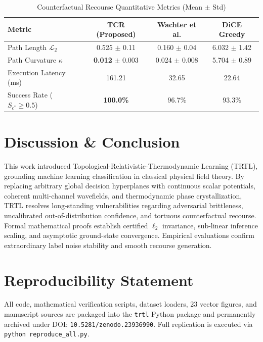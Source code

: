 \documentclass[journal,twoside]{IEEEtran}
\theoremstyle{remark}
\begin{document}
\begin{table}[!h]
\centering
\caption{Counterfactual Recourse Quantitative Metrics (Mean $\pm$ Std)}
\label{tab:recourse}
\small
\begin{tabular}{lccc}
\toprule
\textbf{Metric} & \textbf{TCR (Proposed)} & \textbf{Wachter et al.} & \textbf{DiCE Greedy} \\
\midrule
Path Length $\mathcal{L}_2$ & 0.525 $\pm$ 0.11 & 0.160 $\pm$ 0.04 & 6.032 $\pm$ 1.42 \\
Path Curvature $\kappa$    & \textbf{0.012} $\pm$ 0.003 & 0.024 $\pm$ 0.008 & 5.704 $\pm$ 0.89 \\
Execution Latency (ms)     & 161.21 & 32.65 & 22.64 \\
Success Rate ($S_{c^*} \ge 0.5$) & \textbf{100.0\%} & 96.7\% & 93.3\% \\
\bottomrule
\end{tabular}
\end{table}

\section{Discussion \& Conclusion}
This work introduced Topological-Relativistic-Thermodynamic Learning (TRTL), grounding machine learning classification in classical physical field theory. By replacing arbitrary global decision hyperplanes with continuous scalar potentials, coherent multi-channel wavefields, and thermodynamic phase crystallization, TRTL resolves long-standing vulnerabilities regarding adversarial brittleness, uncalibrated out-of-distribution confidence, and tortuous counterfactual recourse. Formal mathematical proofs establish certified $\ell_2$ invariance, sub-linear inference scaling, and asymptotic ground-state convergence. Empirical evaluations confirm extraordinary label noise stability and smooth recourse generation. 

\section*{Reproducibility Statement}
All code, mathematical verification scripts, dataset loaders, 23 vector figures, and manuscript sources are packaged into the \texttt{trtl} Python package and permanently archived under DOI: \texttt{10.5281/zenodo.23936990}. Full replication is executed via \texttt{python reproduce\_all.py}.
\end{document}
